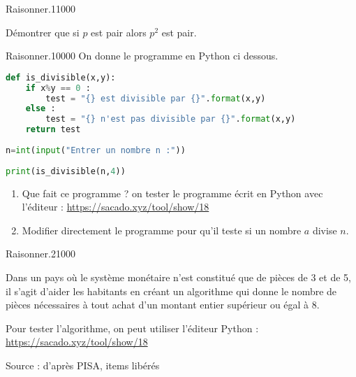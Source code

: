 %
\begin{pageParcourst}



 
\begin{ExoCtN}{Raisonner.}{1}{1}{0}{0}{0}

Démontrer que si $p$ est pair alors $p^2$ est pair.

 
\end{ExoCtN}


\begin{ExoCtN}{Raisonner.}{1}{0}{0}{0}{0}
On donne le programme en Python ci dessous. 
 
\begin{lstlisting}[language=Python] 
def is_divisible(x,y):
    if x%y == 0 :
    	test = "{} est divisible par {}".format(x,y) 
    else :	
        test = "{} n'est pas divisible par {}".format(x,y)
    return test    
    
n=int(input("Entrer un nombre n :"))
    
print(is_divisible(n,4))
\end{lstlisting}
 
\begin{enumerate}
\item Que fait ce programme ? on tester le programme écrit en Python avec l'éditeur : \url{https://sacado.xyz/tool/show/18}  
\item Modifier directement le programme pour qu'il teste si un nombre $a$ divise $n$.   
\end{enumerate}
 
\end{ExoCtN}



\begin{ExoCtN}{Raisonner.}{2}{1}{0}{0}{0}
 
 
Dans un pays où le système monétaire n'est constitué que de pièces de 3 et de 5, il s'agit d'aider les habitants en créant un algorithme  qui donne le nombre de pièces nécessaires à tout achat d'un montant entier supérieur ou égal à 8. 

Pour tester l'algorithme, on peut utiliser l'éditeur Python : \url{https://sacado.xyz/tool/show/18}

\hfill{{\footnotesize Source : d’après PISA, items libérés}}
 

\end{ExoCtN}
\end{pageParcourst}
